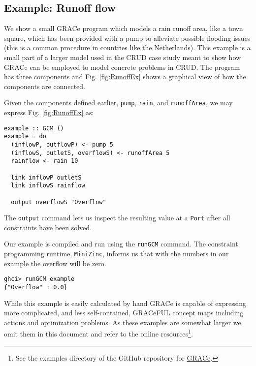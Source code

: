 \subsection{Example: Runoff flow}
\label{example-runoff-flow}

We show a small GRACe program which models a rain runoff area, like a
town square, which has been provided with a pump to alleviate possible
flooding issues (this is a common procedure in countries like the
Netherlands).
%
This example is a small part of a larger model used in the CRUD case
study meant to show how GRACe can be employed to model concrete problems
in CRUD.
%
The program has three components and Fig. \ref{fig:RunoffEx} shows a
graphical view of how the components are connected.
%

Given the components defined earlier, \texttt{pump}, \texttt{rain}, and \texttt{runoffArea},
we may express Fig. \ref{fig:RunoffEx} as:
\begin{verbatim}
example :: GCM ()
example = do
  (inflowP, outflowP) <- pump 5
  (inflowS, outletS, overflowS) <- runoffArea 5
  rainflow <- rain 10

  link inflowP outletS
  link inflowS rainflow

  output overflowS "Overflow"
\end{verbatim}
The \texttt{output} command lets us inspect the resulting value at a \texttt{Port}
after all constraints have been solved.

Our example is compiled and run using the \texttt{runGCM} command.
%
The constraint programming runtime, \texttt{MiniZinc}, informs us
that with the numbers in our example the overflow will be zero.

\begin{verbatim}
ghci> runGCM example
{"Overflow" : 0.0}
\end{verbatim}

While this example is easily calculated by hand GRACe is capable of
expressing more complicated, and less self-contained, GRACeFUL concept
maps including actions and optimization problems.
%
As these examples are somewhat larger we omit them in this document
and refer to the online resources\footnote{See the examples directory
  of the GitHub repository for
  \href{https://github.com/GRACeFUL-project/GRACe}{GRACe}.}.

